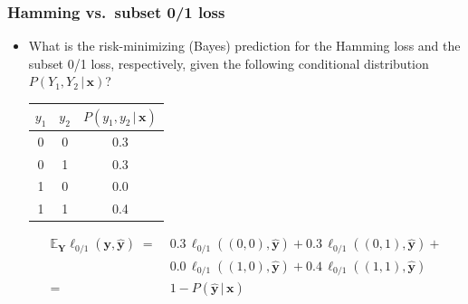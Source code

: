 \documentclass[]{beamer}
\renewcommand{\Pr}{P}
\renewcommand{\vec}[1]{\boldsymbol{#1}}
\newcommand{\by}{\boldsymbol{y}}
\renewcommand{\emph}[1]{\textbf{\color{putblue}#1}}
\begin{document}
\begin{frame}
\frametitle{Hamming vs.\ subset 0/1 loss}
\begin{itemize}
\item What is the risk-minimizing (Bayes) prediction for the Hamming loss and the subset 0/1 loss, respectively, given the following conditional distribution $\Pr(Y_1,Y_2 \, \vert \, \vec{x})$?

\medskip

\begin{center}
\begin{tabular}{ccc}
\toprule
$y_1$ & $y_2$ & $\Pr(y_1,y_2 \, | \, \vec{x})$  \\
\midrule
0   & 0   & 0.3    \\
0   & 1   & 0.3        \\
1   & 0   & 0.0       \\
1   & 1   & 0.4     \\
\bottomrule
\end{tabular}
\end{center}

\pause 

\small
\begin{align*}
\mathbb{E}_{\mathbf{Y}} \ell_{0/1}(\by, \hat{\by}) \; = \; & 0.3 \, \ell_{0/1}((0,0),\hat{\by}) +  
0.3 \, \ell_{0/1}((0,1),\hat{\by}) + \\
& 0.0 \, \ell_{0/1}((1,0),\hat{\by}) +  0.4 \, \ell_{0/1}((1,1),\hat{\by}) \\
= \; &  1 - \Pr(\hat{\by} \, | \, \vec{x}) 
\end{align*}



\end{itemize}
\end{frame}
\end{document}
